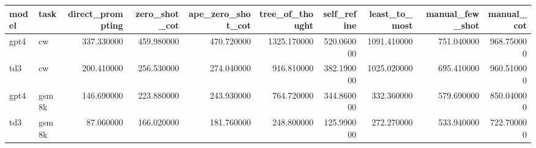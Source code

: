 \begin{tabular}{llrrrrrrrr}
\toprule
model & task & direct_prompting & zero_shot_cot & ape_zero_shot_cot & tree_of_thought & self_refine & least_to_most & manual_few_shot & manual_cot \\
\midrule
gpt4 & cw & 337.330000 & 459.980000 & 470.720000 & 1325.170000 & 520.060000 & 1091.410000 & 751.040000 & 968.750000 \\
td3 & cw & 200.410000 & 256.530000 & 274.040000 & 916.810000 & 382.190000 & 1025.020000 & 695.410000 & 960.510000 \\
gpt4 & gsm8k & 146.690000 & 223.880000 & 243.930000 & 764.720000 & 344.860000 & 332.360000 & 579.690000 & 850.040000 \\
td3 & gsm8k & 87.060000 & 166.020000 & 181.760000 & 248.800000 & 125.990000 & 272.270000 & 533.940000 & 722.700000 \\
\bottomrule
\end{tabular}
